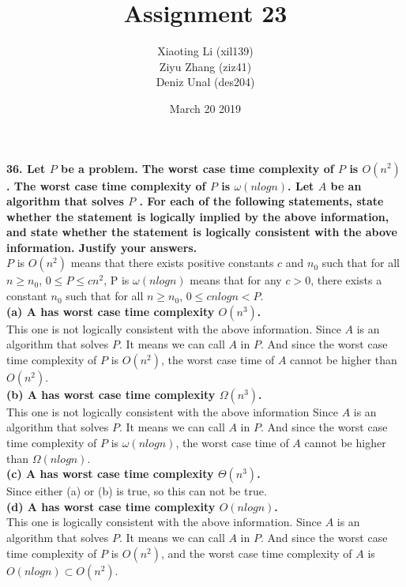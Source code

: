 \documentclass{article}
\title{Assignment 23}
\author{Xiaoting Li (xil139) \\
Ziyu Zhang (ziz41) \\
Deniz Unal (des204)}
\date{March 20 2019}
\begin{document}
\maketitle

\noindent
\textbf{36. Let $P$ be a problem. The worst case time complexity of $P$ is $O(n^2)$. The worst case time complexity of $P$ is $\omega(nlogn)$. Let $A$ be an algorithm that solves $P$ . For each of the following statements, state whether the statement is logically implied by the above information, and state whether the statement is logically consistent with the above information. Justify your answers.} \\ \newline
$P$ is $O(n^2)$ means that there exists positive constants $c$ and $n_0$ such that for all $n\geq n_0$, $0\leq P \leq c n^2$, P is $\omega(nlogn)$ means that for any $c>0$, there exists a constant $n_0$ such that for all $n\geq n_0$, $0\leq c n logn < P$. \\ \newline
\textbf{(a) A has worst case time complexity $O(n^3)$.}\\ \newline
This one is not logically consistent with the above information. Since $A$ is an algorithm that solves $P$. It means we can call $A$ in $P$. And since the worst case time complexity of $P$ is $O(n^2)$, the worst case time of $A$ cannot be higher than $O(n^2)$.\\ \newline
\textbf{(b) A has worst case time complexity $\Omega(n^3)$.} \\ \newline
This one is not logically consistent with the above information Since $A$ is an algorithm that solves $P$. It means we can call $A$ in $P$. And since the worst case time complexity of $P$ is $\omega(nlogn)$, the worst case time of $A$ cannot be higher than $\Omega(nlogn)$.\\ \newline
\textbf{(c) A has worst case time complexity $\Theta(n^3)$.} \\ \newline
Since either (a) or (b) is true, so this can not be true. 
\\ \newline
\textbf{(d) A has worst case time complexity $O(nlogn)$.} \\ \newline This one is logically consistent with the above information. Since $A$ is an algorithm that solves $P$. It means we can call $A$ in $P$. And since the worst case time complexity of $P$ is $O(n^2)$, and the worst case time complexity of $A$ is $O(nlogn) \subset O(n^2)$.\\ \newline
\end{document}
